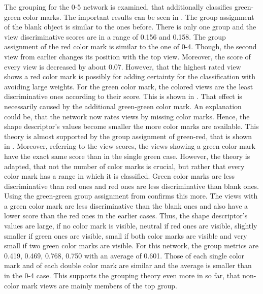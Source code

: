 The grouping for the 0-5 network is examined, that additionally classifies green-green color marks.
The important results can be seen in .
The group assignment of the blank object is similar to the ones before.
There is only one group and the view discriminative scores are in a range of 0.156 and 0.158.
The group assignment of the red color mark is similar to the one of 0-4.
Though, the second view from earlier changes its position with the top view.
Moreover, the score of every view is decreased by about 0.07.
However, that the highest rated view shows a red color mark is possibly for adding certainty for the classification with avoiding large weights.
For the green color mark, the colored views are the least discriminative ones according to their score.
This is shown in .
That effect is necessarily caused by the additional green-green color mark.
An explanation could be, that the network now rates views by missing color marks.
Hence, the shape descriptor's values become smaller the more color marks are available.
This theory is almost supported by the group assignment of green-red, that is shown in .
Moreover, referring to the view scores, the views showing a green color mark have the exact same score than in the single green case.
However, the theory is adapted, that not the number of color marks is crucial, but rather that every color mark has a range in which it is classified.
Green color marks are less discriminative than red ones and red ones are less discriminative than blank ones.
Using the green-green group assignment from  confirms this more.
The views with a green color mark are less discriminative than the blank ones and also have a lower score than the red ones in the earlier cases.
Thus, the shape descriptor's values are large, if no color mark is visible, neutral if red ones are visible, slightly smaller if green ones are visible, small if both color marks are visible and very small if two green color marks are visible.
For this network, the group metrics are 0.419, 0.469, 0.768, 0.750 with an average of 0.601.
Those of each single color mark and of each double color mark are similar and the average is smaller than in the 0-4 case.
This supports the grouping theory even more in so far, that non-color mark views are mainly members of the top group.
